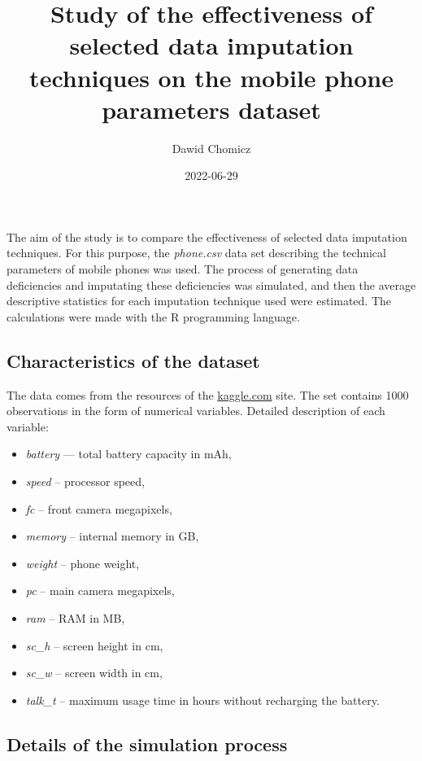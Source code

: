 \documentclass[
  11pt,
]{article}
\title{Study of the effectiveness of selected data imputation techniques on the mobile phone parameters dataset}
\author{Dawid Chomicz}
\date{2022-06-29}
\providecommand{\tightlist}{%
  \setlength{\itemsep}{0pt}\setlength{\parskip}{0pt}}
\begin{document}
\maketitle

The aim of the study is to compare the effectiveness of selected data imputation techniques. For this purpose, the \emph{phone.csv} data set describing the technical parameters of mobile phones was used. The process of generating data deficiencies and imputating these deficiencies was simulated, and then the average descriptive statistics for each imputation technique used were estimated. The calculations were made with the R programming language.

\hypertarget{characteristics-of-the-dataset}{%
\subsection{Characteristics of the dataset}\label{characteristics-of-the-dataset}}

The data comes from the resources of the \href{https://www.kaggle.com/datasets/iabhishekofficial/mobile-price-classification?resource=download\&select=train.csv}{kaggle.com} site. The set contains 1000 observations in the form of numerical variables. Detailed description of each variable:

\begin{itemize}
\tightlist
\item
  \emph{battery} --- total battery capacity in mAh,
\item
  \emph{speed} -- processor speed,
\item
  \emph{fc} -- front camera megapixels,
\item
  \emph{memory} -- internal memory in GB,
\item
  \emph{weight} -- phone weight,
\item
  \emph{pc} -- main camera megapixels,
\item
  \emph{ram} -- RAM in MB,
\item
  \emph{sc\_h} -- screen height in cm,
\item
  \emph{sc\_w} -- screen width in cm,
\item
  \emph{talk\_t} -- maximum usage time in hours without recharging the battery.
\end{itemize}

\hypertarget{details-of-the-simulation-process}{%
\subsection{Details of the simulation process}\label{details-of-the-simulation-process}}
\end{document}
